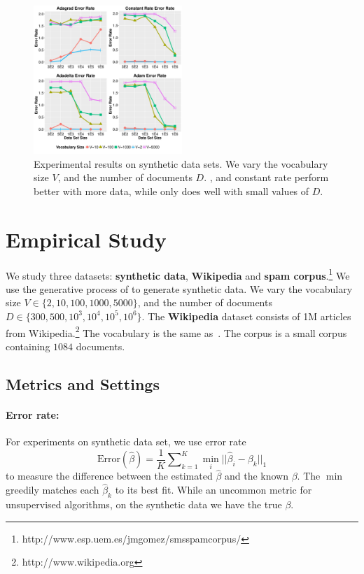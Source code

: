 \begin{figure}[t]			\centering
	\includegraphics[width= 0.5\textwidth]{2017_emnlp_adagrad_olda/figures/Error-Rate.pdf}

	\caption{Experimental results on synthetic data sets. We vary the vocabulary size $V$, and the number of documents $D$. ,  and constant rate perform better with more data, while  only does well with small values of $D$.}
	\label{fig:error_rate}       
\end{figure}


\section{Empirical Study}
\label{sec:experiments}



We study three datasets: \textbf{synthetic data}, \textbf{Wikipedia} and
\textbf{ spam
corpus}.\footnote{http://www.esp.uem.es/jmgomez/smsspamcorpus/} We use the
generative process of  to generate synthetic data.
We vary the vocabulary size $V \in \{2, 10, 100,
1000, 5000\}$, and the number of documents $D \in \{300, 500, 10^3, 10^4, 10^5,
10^6\}$.
The \textbf{Wikipedia} dataset consists of 1M articles from
Wikipedia.\footnote{http://www.wikipedia.org}
The vocabulary is the same as~\cite{hoffman2010online}.
The  corpus is a small corpus containing $1084$ documents.




\subsection{Metrics and Settings}





\paragraph{Error rate:} For experiments on synthetic data set, we use
error rate
\begin{equation}
\mbox{Error}(\hat \beta ) = \frac{1}{K} \sum\nolimits_{k = 1}^K {{{\min}_i}||{{\hat \beta }_i} - {\beta _k}|{|_1}}
\end{equation}
to measure the difference between the estimated $\hat{\beta}$ and
the known $\beta$.
The $\min$ greedily matches each $\hat \beta_k$ to its best fit.
While an uncommon metric for unsupervised algorithms,
on the synthetic data we have the true $\beta$.

